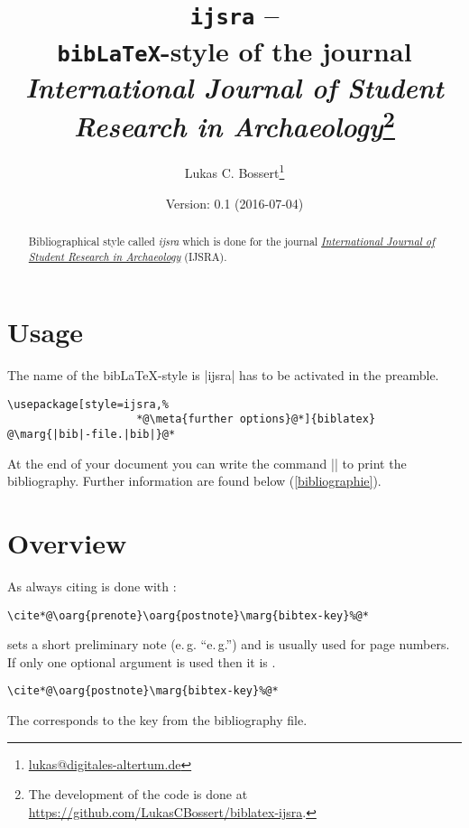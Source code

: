 \documentclass[a4paper,
10pt,
english
]{ltxdoc}
\begin{document}
\title{\texttt{ijsra} -- \\\texttt{bib\LaTeX}-style of the journal \emph{International Journal of Student Research in Archaeology}\footnote{The development of the code is done at \url{https://github.com/LukasCBossert/biblatex-ijsra}.}}
\author{Lukas C. Bossert\thanks{\href{mailto:lukas@digitales-altertum.de}{lukas@digitales-altertum.de}}}
\date{Version: 0.1 (2016-07-04)}
 \maketitle
\begin{abstract}
Bibliographical style called \emph{ijsra} which is done for the journal \href{http://www.ijsra.org}{\emph{International Journal of Student Research in Archaeology}} (IJSRA).
 \end{abstract}

\section{Usage}
   The name of the bib\LaTeX-style is  |ijsra| has to be activated in the preamble. 

\begin{lstlisting}
\usepackage[style=ijsra,%
					*@\meta{further options}@*]{biblatex}
@\marg{|bib|-file.|bib|}@*
\end{lstlisting}


At the end of your document you can write the command |\printbibliography| to print 
the bibliography. 
Further information are found below   (\cref{bibliographie}).

\section{Overview}\label{overview}

\DescribeMacro{\cite}%
As always citing is done with :
\begin{lstlisting}
\cite*@\oarg{prenote}\oarg{postnote}\marg{bibtex-key}%@*
\end{lstlisting}

 sets a short preliminary note (e.\,g. \enquote{e.\,g.}) and  is usually used for page numbers.
If only one optional argument is used then it is .
\begin{lstlisting}
\cite*@\oarg{postnote}\marg{bibtex-key}%@*
\end{lstlisting}
The  corresponds to the key from the bibliography file.
\end{document}

